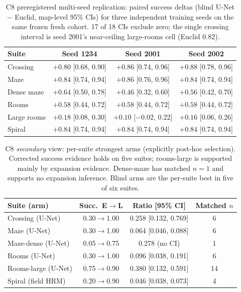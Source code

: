 \documentclass[letterpaper]{article} %
\newcommand{\stage}[1]{\textsc{#1}}
\begin{document}
\begin{table}[t]
\centering
\scriptsize
\setlength{\tabcolsep}{2.6pt}
\begin{tabular}{@{}lccc@{}}
\toprule
Suite & Seed 1234 & Seed 2001 & Seed 2002 \\
\midrule
Crossing & $+0.80$ [0.68, 0.90] & $+0.86$ [0.74, 0.96] & $+0.88$ [0.78, 0.96] \\
Maze & $+0.84$ [0.74, 0.94] & $+0.86$ [0.76, 0.96] & $+0.84$ [0.74, 0.94] \\
Dense maze & $+0.64$ [0.50, 0.78] & $+0.46$ [0.32, 0.60] & $+0.56$ [0.42, 0.70] \\
Rooms & $+0.58$ [0.44, 0.72] & $+0.58$ [0.44, 0.72] & $+0.58$ [0.44, 0.72] \\
Large rooms & $+0.18$ [0.08, 0.30] & $+0.10$ [$-$0.02, 0.22] & $+0.16$ [0.06, 0.26] \\
Spiral & $+0.84$ [0.74, 0.94] & $+0.84$ [0.74, 0.94] & $+0.84$ [0.74, 0.94] \\
\bottomrule
\end{tabular}
\caption{\stage{C8} preregistered multi-seed replication: paired success deltas (blind U-Net $-$ Euclid, map-level 95\% CIs) for three independent training seeds on the same frozen fresh cohort. 17 of 18 CIs exclude zero; the single crossing interval is seed 2001's near-ceiling large-rooms cell (Euclid 0.82).}
\label{tab:c8seeds}
\end{table}

\begin{table}[h]
\centering
\scriptsize
\setlength{\tabcolsep}{3pt}
\begin{tabular}{@{}lccc@{}}
\toprule
Suite (arm) & Succ.\ E$\to$L & Ratio [95\% CI] & Matched $n$ \\
\midrule
Crossing (U-Net) & 0.30$\to$1.00 & 0.258 [0.132, 0.769] & 6 \\
Maze (U-Net) & 0.30$\to$1.00 & 0.064 [0.046, 0.088] & 6 \\
Maze-dense (U-Net) & 0.05$\to$0.75 & 0.278 (no CI) & 1 \\
Rooms (U-Net) & 0.30$\to$1.00 & 0.096 [0.038, 0.191] & 6 \\
Rooms-large (U-Net) & 0.75$\to$0.90 & 0.380 [0.132, 0.591] & 14 \\
Spiral (field HRM) & 0.20$\to$0.90 & 0.046 [0.038, 0.073] & 4 \\
\bottomrule
\end{tabular}
\caption{\stage{C8} \emph{secondary} view: per-suite strongest arms (explicitly post-hoc selection). Corrected success evidence holds on five suites; rooms-large is supported mainly by expansion evidence. Dense-maze has matched $n{=}1$ and supports no expansion inference. Blind arms are the per-suite best in five of six suites.}
\label{tab:c8}
\end{table}
\end{document}
